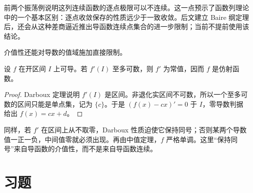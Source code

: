 前两个振荡例说明这列连续函数的逐点极限可以不连续。这一点预示了函数列理论中的一个基本区别：逐点收敛保存的性质远少于一致收敛。后文建立 Baire 纲定理后，还会从这种差商逼近推出导函数连续点集合的进一步限制；当前不提前使用该结论。

介值性还能对导数的值域施加直接限制。

\begin{corollary}[至多可数值域的导函数]
\label{cor:countable-range-derivative-affine}
设 \(f\) 在开区间 \(I\) 上可导。若 \(f'(I)\) 至多可数，则 \(f'\) 为常值，因而 \(f\) 是仿射函数。
\end{corollary}

\begin{proof}
Darboux 定理说明 \(f'(I)\) 是区间。非退化实区间不可数，所以一个至多可数的区间只能是单点集，记为 \(\{c\}\)。于是 \((f(x)-cx)'=0\) 于 \(I\)，零导数判据给出 \(f(x)=cx+d\)。
\end{proof}

同样，若 \(f'\) 在区间上从不取零，Darboux 性质迫使它保持同号；否则某两个导数值一正一负，中间值零就必须出现。再由中值定理，\(f\) 严格单调。这里“保持同号”来自导函数的介值性，而不是来自导函数连续。

\section*{习题}


